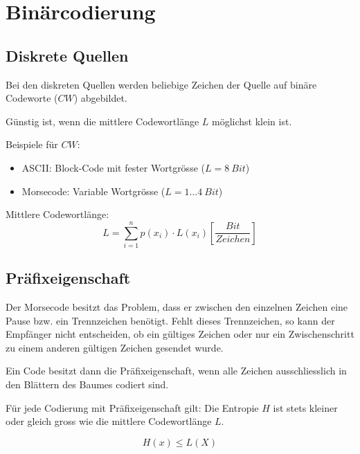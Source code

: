 \section{Binärcodierung}



\subsection{Diskrete Quellen}

Bei den diskreten Quellen werden beliebige Zeichen der Quelle auf binäre
Codeworte ($CW$) abgebildet.

Günstig ist, wenn die mittlere Codewortlänge $L$ möglichst klein ist.

Beispiele für $CW$:
\begin{itemize}
	\item ASCII: Block-Code mit fester Wortgrösse ($L = 8 \: Bit$)
	\item Morsecode: Variable Wortgrösse ($L = 1 \ldots 4 \: Bit$)
\end{itemize}

Mittlere Codewortlänge:
\[
	L = \sum_{i=1}^n p(x_i) \cdot L(x_i) \left[\frac{Bit}{Zeichen}\right]
\]


\subsection{Präfixeigenschaft}

Der Morsecode besitzt das Problem, dass er zwischen den einzelnen Zeichen eine
Pause bzw. ein Trennzeichen benötigt. Fehlt dieses Trennzeichen, so kann der
Empfänger nicht entscheiden, ob ein gültiges Zeichen oder nur ein
Zwischenschritt zu einem anderen gültigen Zeichen gesendet wurde.

Ein Code besitzt dann die Präfixeigenschaft, wenn alle Zeichen ausschliesslich
in den Blättern des Baumes codiert sind.  

Für jede Codierung mit Präfixeigenschaft gilt: Die Entropie $H$ ist stets
kleiner oder gleich gross wie die mittlere Codewortlänge $L$.

\[
	H(x) \le L(X)
\]

